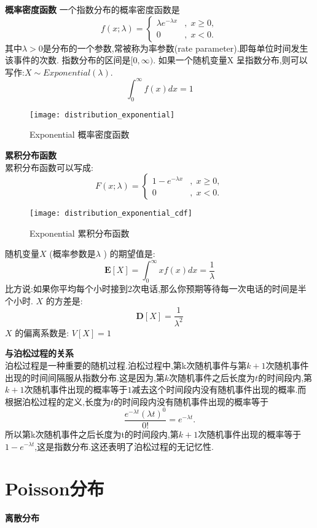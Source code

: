 \documentclass[openany]{book}
\begin{document}
\textbf{概率密度函数}
一个指数分布的概率密度函数是
$$f(x;\lambda )=\left\{{\begin{matrix}\lambda e^{{-\lambda x}}&,\;x\geq 0,\\0&,\;x<0.\end{matrix}}\right.$$
其中$\lambda  > 0$是分布的一个参数,常被称为率参数(rate parameter).即每单位时间发生该事件的次数.
指数分布的区间是$[0,\infty)$. 如果一个随机变量X 呈指数分布,则可以写作:$X \sim Exponential(\lambda )$.
$$
\int_0^{\infty} f(x)dx = 1
$$
\begin{figure}[htbp]
  \centering
  \texttt{[image: distribution\_exponential]}\\
  \caption{Exponential 概率密度函数}\label{fig.distribution.exponential}
\end{figure}
	
\textbf{累积分布函数}\\
累积分布函数可以写成:
$$F(x;\lambda )=\left\{{\begin{matrix}1-e^{{-\lambda x}}&,\;x\geq 0,\\0&,\;x<0.\end{matrix}}\right.$$
\begin{figure}[htbp]
  \centering
  \texttt{[image: distribution\_exponential\_cdf]}\\
  \caption{Exponential 累积分布函数}\label{fig.distribution.exponential.cdf}
\end{figure}
	
随机变量$X$ (概率参数是$\lambda$ ) 的期望值是:
$$
{\mathbf  {E}}[X]=\int_0^{\infty} xf(x)dx = {\frac  {1}{\lambda }}
$$
比方说:如果你平均每个小时接到2次电话,那么你预期等待每一次电话的时间是半个小时.
$X$ 的方差是:
$${\mathbf  {D}}[X]={\frac{1}{\lambda ^{2}}}
$$
$X$ 的偏离系数是: $V[X] = 1$

\textbf{与泊松过程的关系}\\
泊松过程是一种重要的随机过程.泊松过程中,第k次随机事件与第$k+1$次随机事件出现的时间间隔服从指数分布.这是因为,第$k$次随机事件之后长度为$t$的时间段内,第$k+1$次随机事件出现的概率等于$1$减去这个时间段内没有随机事件出现的概率.而根据泊松过程的定义,长度为$t$的时间段内没有随机事件出现的概率等于
$$
{\frac  {e^{{-\lambda t}}(\lambda t)^{0}}{0!}}=e^{{-\lambda t}}.
$$
所以第k次随机事件之后长度为t的时间段内,第$k+1$次随机事件出现的概率等于$1-e^{{-\lambda t}}$,这是指数分布.这还表明了泊松过程的无记忆性.

\section{Poisson分布}
\label{sec.distribution.poisson}
\textbf{离散分布}
\end{document}
